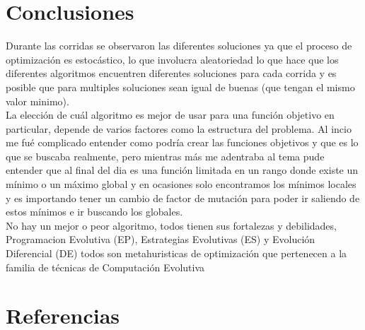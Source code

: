 \documentclass{article}
\begin{document}
\section{Conclusiones}

Durante las corridas se observaron las diferentes soluciones ya que el proceso de optimización es estocástico, lo que involucra aleatoriedad lo que hace que los diferentes algoritmos encuentren diferentes soluciones para cada corrida y es posible que para multiples soluciones sean igual de buenas (que tengan el mismo valor minimo).\\

La elección de cuál algoritmo es mejor de usar para una función objetivo en particular, depende de varios factores como la estructura del problema. Al incio me fué complicado entender como podría crear las funciones objetivos y que es lo que se buscaba realmente, pero mientras más me adentraba al tema pude entender que al final del dia es una función limitada en un rango donde existe un mínimo o un máximo global y en ocasiones solo encontramos los mínimos locales y es importando tener un cambio de factor de mutación para poder ir saliendo de estos mínimos e ir buscando los globales.\\

No hay un mejor o peor algoritmo, todos tienen sus fortalezas y debilidades, Programacion Evolutiva (EP), Estrategias Evolutivas (ES) y Evolución Diferencial (DE) todos son metahuristicas de optimización que pertenecen a la familia de técnicas de Computación Evolutiva\\

\section{Referencias}
\end{document}

